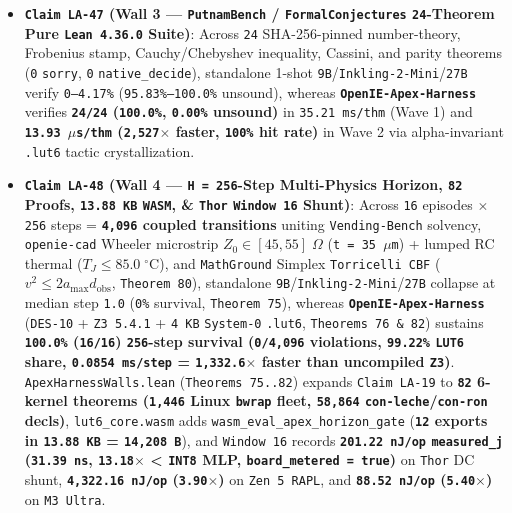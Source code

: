 \documentclass[10pt]{article}
\begin{document}
\begin{itemize}
  \item \textbf{\texttt{Claim LA-47} (Wall 3 --- \texttt{PutnamBench} / \texttt{FormalConjectures} \texttt{24}-Theorem Pure \texttt{Lean 4.36.0} Suite)}: Across \texttt{24} SHA-256-pinned number-theory, Frobenius stamp, Cauchy/Chebyshev inequality, Cassini, and parity theorems (\texttt{0} \texttt{sorry}, \texttt{0} \texttt{native\_decide}), standalone 1-shot \texttt{9B}/\texttt{Inkling-2-Mini}/\texttt{27B} verify \texttt{0--4.17\%} (\texttt{95.83\%--100.0\%} unsound), whereas \textbf{\texttt{OpenIE-Apex-Harness}} verifies \textbf{\texttt{24/24} (\texttt{100.0\%}, \texttt{0.00\%} unsound)} in \texttt{35.21 ms/thm} (Wave 1) and \textbf{\texttt{13.93 $\mu$s/thm} (\texttt{2,527$\times$} faster, \texttt{100\%} hit rate)} in Wave 2 via alpha-invariant \texttt{.lut6} tactic crystallization.
  \item \textbf{\texttt{Claim LA-48} (Wall 4 --- \texttt{H = 256}-Step Multi-Physics Horizon, \texttt{82} Proofs, \texttt{13.88 KB} \texttt{WASM}, \& \texttt{Thor} \texttt{Window 16} Shunt)}: Across \texttt{16} episodes $\times$ \texttt{256} steps = \textbf{\texttt{4,096} coupled transitions} uniting \texttt{Vending-Bench} solvency, \texttt{openie-cad} Wheeler microstrip $Z_0 \in [45, 55]\;\Omega$ (\texttt{t = 35 $\mu$m}) + lumped RC thermal ($T_J \le 85.0\;^\circ\text{C}$), and \texttt{MathGround} Simplex \texttt{Torricelli CBF} ($v^2 \le 2 a_{\max} d_{\text{obs}}$, \texttt{Theorem 80}), standalone \texttt{9B}/\texttt{Inkling-2-Mini}/\texttt{27B} collapse at median step \texttt{1.0} (\texttt{0\%} survival, \texttt{Theorem 75}), whereas \textbf{\texttt{OpenIE-Apex-Harness}} (\texttt{DES-10} + \texttt{Z3 5.4.1} + \texttt{4 KB} \texttt{System-0} \texttt{.lut6}, \texttt{Theorems 76 \& 82}) sustains \textbf{\texttt{100.0\%} (\texttt{16/16}) \texttt{256}-step survival (\texttt{0/4,096} violations, \texttt{99.22\%} \texttt{LUT6} share, \texttt{0.0854 ms/step} = \texttt{1,332.6$\times$} faster than uncompiled \texttt{Z3})}. \texttt{ApexHarnessWalls.lean} (\texttt{Theorems 75..82}) expands \texttt{Claim LA-19} to \textbf{\texttt{82} 6-kernel theorems (\texttt{1,446} Linux \texttt{bwrap} fleet, \texttt{58,864} \texttt{con-leche}/\texttt{con-ron} decls)}, \texttt{lut6\_core.wasm} adds \texttt{wasm\_eval\_apex\_horizon\_gate} (\textbf{\texttt{12} exports in \texttt{13.88 KB} = \texttt{14,208 B}}), and \texttt{Window 16} records \textbf{\texttt{201.22 nJ/op} \texttt{measured\_j} (\texttt{31.39 ns}, \texttt{13.18$\times$} < \texttt{INT8} MLP, \texttt{board\_metered = true})} on \texttt{Thor} DC shunt, \textbf{\texttt{4,322.16 nJ/op} (\texttt{3.90$\times$})} on \texttt{Zen 5 RAPL}, and \textbf{\texttt{88.52 nJ/op} (\texttt{5.40$\times$})} on \texttt{M3 Ultra}.
\end{itemize}
\end{document}
